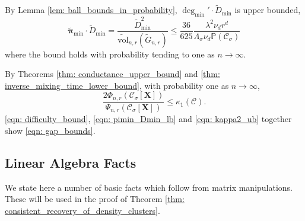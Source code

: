 \documentclass{article}
\newcommand{\vol}{\mathrm{vol}}
\newcommand{\1}{\mathbf{1}}
\newcommand{\degminpr}{\deg_{\min}'}
\newcommand{\piminwt}{\widetilde{\pibf}_{\min}}
\newcommand{\pibf}{\bm{\pi}}
\newcommand{\Xbf}{\mathbf{X}}
\newcommand{\Pbb}{\mathbb{P}}
\newcommand{\Cset}{\mathcal{C}}
\newcommand{\Csig}{\Cset_{\sigma}}
\theoremstyle{aldenthm}
\begin{document}
By Lemma \ref{lem: ball_bounds_in_probability}, $\degminpr\cdot \widetilde{D}_{\min}$ is upper bounded,
\begin{equation}
\label{eqn: pimin_Dmin_lb}
\piminwt \cdot \widetilde{D}_{\min} = \frac{\widetilde{D}_{\min}^2}{\widetilde{\vol}_{n,r}(\widetilde{G}_{n,r})} \leq \frac{36}{625} \frac{\lambda^2 \nu_d r^d}{\Lambda_{\sigma} \nu_d \Pbb(\Csig)}  
\end{equation}
where the bound holds with probability tending to one as $n \to \infty$. 

By Theorems \ref{thm: conductance_upper_bound} and \ref{thm: inverse_mixing_time_lower_bound}, with probability one as $n \to \infty$,
\begin{equation}
\label{eqn: difficulty_bound}
\frac{2\Phi_{n,r}(\Csig[\Xbf])}{\Psi_{n,r}(\Csig[\Xbf])} \leq \kappa_1(\Cset).
\end{equation}
\eqref{eqn: difficulty_bound}, \eqref{eqn: pimin_Dmin_lb} and \eqref{eqn: kappa2_ub} together show \eqref{eqn: gap_bounds}.



\subsection{Linear Algebra Facts}
\label{sec: linalg}

We state here a number of basic facts which follow from matrix manipulations. These will be used in the proof of Theorem \ref{thm: consistent_recovery_of_density_clusters}. 
\end{document}
